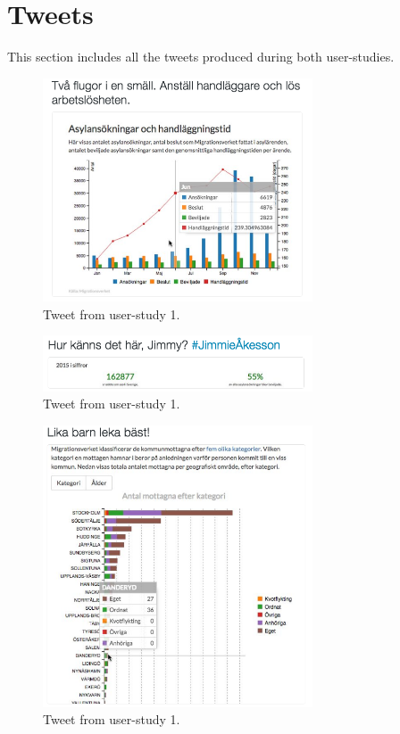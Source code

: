 \documentclass{acmtog} %
\begin{document}

\newpage
\appendix

\section{Tweets}
\label{appen:tweets}
This section includes all the tweets produced during both user-studies.

\begin{figure}[!hb]
\centering
\includegraphics[width=8cm]{img/tweet1_1.png}
\caption{Tweet from user-study 1.}
\label{fig:tweet1_1}
\end{figure}

\begin{figure}[!hb]
\centering
\includegraphics[width=8cm]{img/tweet1_2.png}
\caption{Tweet from user-study 1.}
\label{fig:tweet1_2}
\end{figure}

\begin{figure}
\centering
\includegraphics[width=8cm]{img/tweet1_3.png}
\caption{Tweet from user-study 1.}
\label{fig:tweet1_3}
\end{figure}
\end{document}
